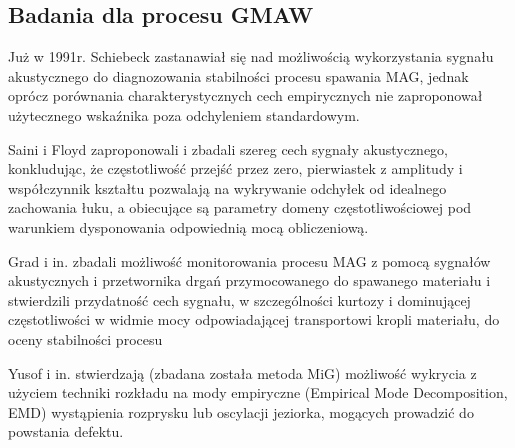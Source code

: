 \documentclass{mwart}
\begin{document}
\subsection{Badania dla procesu GMAW}

    Już w 1991r. Schiebeck\cite{schiebeck_audible_1991} zastanawiał się nad możliwością wykorzystania sygnału akustycznego do diagnozowania stabilności procesu spawania MAG, jednak oprócz porównania charakterystycznych cech empirycznych nie zaproponował użytecznego wskaźnika poza odchyleniem standardowym.
    
    Saini i Floyd \cite{saini_investigation_1998} zaproponowali i zbadali szereg cech sygnały akustycznego, konkludując, że częstotliwość przejść przez zero, pierwiastek z amplitudy i współczynnik kształtu pozwalają na wykrywanie odchyłek od idealnego zachowania łuku, a obiecujące są parametry domeny częstotliwościowej pod warunkiem dysponowania odpowiednią mocą obliczeniową.
    
    Grad i in.\cite{grad_feasibility_2004} zbadali możliwość monitorowania procesu MAG z pomocą sygnałów akustycznych i przetwornika drgań przymocowanego do spawanego materiału i stwierdzili przydatność cech sygnału, w szczególności kurtozy i dominującej częstotliwości w widmie mocy odpowiadającej transportowi kropli materiału, do oceny stabilności procesu
    
    Yusof i in. \cite{yusof_analysis_2014}stwierdzają (zbadana została metoda MiG) możliwość wykrycia z użyciem techniki rozkładu na mody empiryczne (Empirical Mode Decomposition, EMD) wystąpienia rozprysku lub oscylacji jeziorka, mogących prowadzić do powstania defektu. 
\end{document}
